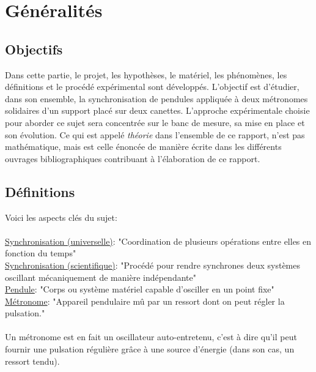 \documentclass[a4paper,11pt]{report}
\begin{document}
\newpage
\null
\thispagestyle{empty}
\chapter{Généralités}
\section{Objectifs}
Dans cette partie, le projet, les hypothèses, le matériel, les phénomènes, les définitions et le procédé expérimental sont développés. L'objectif est d'étudier, dans son ensemble, la synchronisation de pendules appliquée à deux métronomes solidaires d'un support placé sur deux canettes. L'approche expérimentale choisie pour aborder ce sujet sera concentrée sur le banc de mesure, sa mise en place et son évolution. Ce qui est appelé {\it théorie} dans l'ensemble de ce rapport, n'est pas mathématique, mais est celle énoncée de manière écrite dans les différents ouvrages bibliographiques contribuant à l'élaboration de ce rapport.

\section{Définitions}
Voici les aspects clés du sujet:\\\\
\underline{Synchronisation (universelle)}: "Coordination de plusieurs opérations entre elles en fonction du temps" \cite{wiki}\\
\underline{Synchronisation (scientifique)}: "Procédé pour rendre synchrones deux systèmes oscillant mécaniquement de manière indépendante" \cite{cntrl}\\
\underline{Pendule}: "Corps ou système matériel capable d'osciller en un point fixe" \cite{ikonet}\\
\underline{Métronome}: "Appareil pendulaire mû par un ressort dont on peut régler la pulsation." \cite{pend}\\\\
Un métronome est en fait un oscillateur auto-entretenu, c'est à dire qu'il peut fournir une pulsation régulière grâce à une source d'énergie (dans son cas, un ressort tendu).
\end{document}
